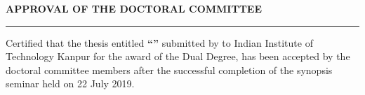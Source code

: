 \baselineskip
\centerline{\textbf{APPROVAL OF THE DOCTORAL COMMITTEE}}
\noindent\rule{16cm}{1pt}
\baselineskip



\noindent
Certified that the thesis entitled \textbf{\textquotedblleft \thesistitle\textquotedblright} submitted by \textbf{\authorname} to Indian Institute of Technology Kanpur for the award of the Dual Degree, has been accepted by the doctoral committee members after the successful completion of the synopsis seminar held on 22 July 2019.


\vspace*{2.5cm}

